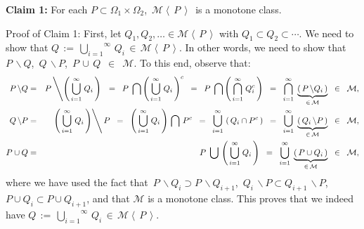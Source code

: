 \vskip 0.5cm
\begin{center}
\begin{minipage}{6.5in}
\textbf{Claim 1:}\quad
For each $P \subset \Omega_{1}\times\Omega_{2}$,
\,$\mathcal{M}\!\left\langle\,P\,\right\rangle$\, is a monotone class.
\end{minipage}
\end{center}
Proof of Claim 1:\quad
First, let $Q_{1}, Q_{2}, \ldots \in \mathcal{M}\!\left\langle\,P\,\right\rangle$
with $Q_{1} \subset Q_{2} \subset \cdots$.
We need to show that
$Q \,:=\, \overset{\infty}{\underset{i=1}{\bigcup}}\,Q_{i} \,\in\, \mathcal{M}\!\left\langle\,P\,\right\rangle$.
In other words, we need to show that
\,$P\,\backslash Q$,\, $Q\,\backslash P$,\, $P\,\cup\,Q$ \,$\in$\, $\mathcal{M}$.
To this end, observe that:
\begin{eqnarray*}
P\,\backslash Q
&=&
	P\left\backslash\left(\,\overset{\infty}{\underset{i=1}{\bigcup}}\;Q_{i}\,\right)\right.
	\;\;=\;\;
	P\;\bigcap\left(\,\overset{\infty}{\underset{i=1}{\bigcup}}\;Q_{i}\,\right)^{c}
	\;\;=\;\;
	P\;\bigcap\left(\,\overset{\infty}{\underset{i=1}{\bigcap}}\;Q_{i}^{c}\,\right)
	\;\;=\;\;
	\overset{\infty}{\underset{i=1}{\bigcap}}\,\;\underset{\in\,\mathcal{M}}{\underbrace{\left(\,P\,\backslash Q_{i}\,\right)}}
	\;\; \in \;\; \mathcal{M},
\\
Q\,\backslash P
&=&
	\left. \left(\,\overset{\infty}{\underset{i=1}{\bigcup}}\;Q_{i}\,\right) \right\backslash P
	\;\;=\;\;
	\left(\,\overset{\infty}{\underset{i=1}{\bigcup}}\;Q_{i}\,\right) \,\bigcap\, P^{c}
	\;\;=\;\;
	\overset{\infty}{\underset{i=1}{\bigcup}}\,\left(\,Q_{i} \cap P^{c}\,\right)
	\;\;=\;\;
	\overset{\infty}{\underset{i=1}{\bigcup}}\,\;\underset{\in\,\mathcal{M}}{\underbrace{\left(\,Q_{i}\,\backslash P\,\right)}}
	\;\; \in \;\; \mathcal{M},
\\
P\cup Q
&=&
	P\;\bigcup\,\left(\,\overset{\infty}{\underset{i=1}{\bigcup}}\;Q_{i}\,\right)
	\;\;=\;\;
	\overset{\infty}{\underset{i=1}{\bigcup}}\,\;\underset{\in\,\mathcal{M}}{\underbrace{\left(\,P \cup Q_{i}\,\right)}}
	\;\; \in \;\; \mathcal{M},
\end{eqnarray*}
where we have used the fact that
\,$P\,\backslash Q_{i} \supset P\,\backslash Q_{i+1}$,
\,$Q_{i}\,\backslash P \subset Q_{i+1}\,\backslash P$,
\,$P \cup Q_{i} \subset P \cup Q_{i+1}$, and
that $\mathcal{M}$ is a monotone class.
This proves that we indeed have
$Q \,:=\, \overset{\infty}{\underset{i=1}{\bigcup}}\,Q_{i} \,\in\, \mathcal{M}\!\left\langle\,P\,\right\rangle$.

